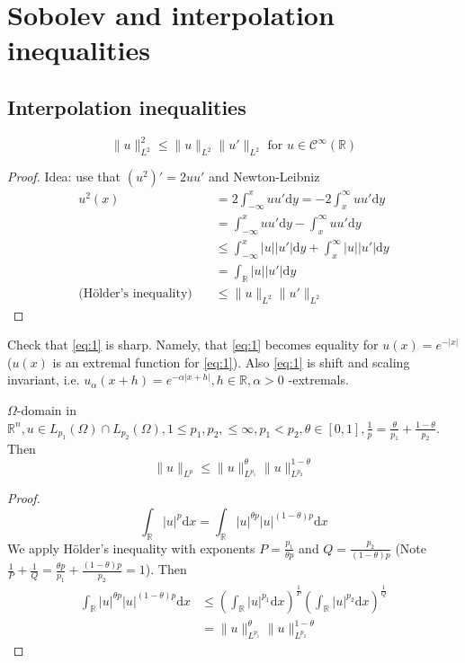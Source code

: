 \documentclass{report}
\begin{document}
\setcounter{chapter}{4}
\chapter{Sobolev and interpolation inequalities}
\section{Interpolation inequalities}

\ex{}
{
    \begin{equation} \label{eq:1}
        \|u\|_{L^{2}}^{2} \leq \|u\|_{L^{2}} \|u'\|_{L^{2}} \text{ for } u \in \mathcal{C}^{\infty}(\mathbb{R}) 
    \end{equation}
}

\begin{proof}
    Idea: use that $(u^2)' = 2uu'$ and Newton-Leibniz
    \begin{align*}
        u^2(x) &= 2 \int_{-\infty}^{x} u u' \mathrm{d}y = -2 \int_{x}^{\infty} u u' \mathrm{d}y \\
        &= \int_{-\infty}^{x} u u' \mathrm{d}y - \int_{x}^{\infty} u u' \mathrm{d}y \\
        & \leq \int_{-\infty}^{x} |u| |u'| \mathrm{d}y + \int_{x}^{\infty} |u| |u'| \mathrm{d}y \\
        &= \int_{\mathbb{R}} |u| |u'| \mathrm{d}y \\
        \text{(Hölder's inequality)} \quad & \leq \|u\|_{L^{2}} \|u'\|_{L^{2}}
    \end{align*}
\end{proof}

\qs{}
{
    Check that \ref{eq:1} is sharp. Namely, that \ref{eq:1} becomes equality for $u(x) = e^{-|x|}$ ($u(x)$ is an extremal function for \ref{eq:1}). Also \ref{eq:1} is shift and scaling invariant, i.e. $u_{\alpha}(x+h) = e^{-\alpha|x+h|}, h \in \mathbb{R}, \alpha>0$ -extremals.
}

{
    $\Omega$-domain in $\mathbb{R}^{n}, u \in L_{p_1}(\Omega) \cap L_{p_2}(\Omega), 1 \leq p_1, p_2, \leq \infty, p_1 < p_2, \theta \in [0, 1], \frac{1}{p} = \frac{\theta}{p_1} + \frac{1-\theta}{p_2}$. Then
    \begin{equation}\label{eq:2}
        \|u\|_{L^{p}} \leq \|u\|_{L^{p_1}}^{\theta} \|u\|_{L^{p_2}}^{1 - \theta}
    \end{equation} 
}

\begin{proof}
    $$\int_{\mathbb{R}} |u|^p \mathrm{d}x = \int_{\mathbb{R}} |u|^{\theta p} |u|^{(1-\theta) p} \mathrm{d}x$$
    We apply Hölder's inequality with exponents $P = \frac{p_1}{\theta p}$ and $Q = \frac{p_2}{(1-\theta)p}$ (Note $\frac{1}{P} + \frac{1}{Q} = \frac{\theta p}{p_1} + \frac{(1-\theta)p}{p_2} = 1$). Then    
    \begin{align*}
        \int_{\mathbb{R}} |u|^{\theta p} |u|^{(1-\theta) p} \mathrm{d}x &\leq \left(\int_{\mathbb{R}} |u|^{p_1} \mathrm{d}x \right)^{\frac{1}{P}} \left(\int_{\mathbb{R}} |u|^{p_2} \mathrm{d}x \right)^{\frac{1}{Q}} \\
        &= \|u\|_{L^{p_1}}^{\theta} \|u\|_{L^{p_2}}^{1 - \theta}
    \end{align*}
\end{proof}
\end{document}
